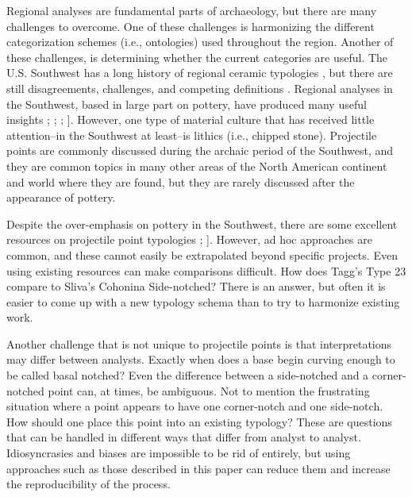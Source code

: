 \documentclass[a4paper]{article}
\begin{document}
Regional analyses are fundamental parts of archaeology, but there are many challenges to overcome. One of these challenges is harmonizing the different categorization schemes (i.e., ontologies) used throughout the region. Another of these challenges, is determining whether the current categories are useful. The U.S. Southwest has a long history of regional ceramic typologies \autocites[e.g.,][]{Colton1956-zy,gladwin1930a,Hargrave1932-ng,Kidder1915-ae,Martin1940-jg}, but there are still disagreements, challenges, and competing definitions \autocite{Duff1996-au}. Regional analyses in the Southwest, based in large part on pottery, have produced many useful insights \autocites[e.g.,][]{Bernardini2005-ue,Clark2019-bz}; \textcite{Hegmon2016-xw}; \textcite{Mills2013-wq}; \textcite{Peeples2018-ib}{]}. However, one type of material culture that has received little attention--in the Southwest at least--is lithics (i.e., chipped stone). Projectile points are commonly discussed during the archaic period of the Southwest, and they are common topics in many other areas of the North American continent and world where they are found, but they are rarely discussed after the appearance of pottery.

Despite the over-emphasis on pottery in the Southwest, there are some excellent resources on projectile point typologies \autocites[e.g.,][]{Hoffman1997-hb,Justice2002-cf,Loendorf2004-tp}; \textcite{Sliva2006-nq}{]}. However, ad hoc approaches are common, and these cannot easily be extrapolated beyond specific projects. Even using existing resources can make comparisons difficult. How does Tagg's \autocite*[p.111]{Tagg1994-wi} Type 23 compare to Sliva's \autocite[p.~35]{Sliva2006-nq} Cohonina Side-notched? There is an answer, but often it is easier to come up with a new typology schema than to try to harmonize existing work.

Another challenge that is not unique to projectile points is that interpretations may differ between analysts. Exactly when does a base begin curving enough to be called basal notched? Even the difference between a side-notched and a corner-notched point can, at times, be ambiguous. Not to mention the frustrating situation where a point appears to have one corner-notch and one side-notch. How should one place this point into an existing typology? These are questions that can be handled in different ways that differ from analyst to analyst. Idiosyncrasies and biases are impossible to be rid of entirely, but using approaches such as those described in this paper can reduce them and increase the reproducibility of the process.
\end{document}
